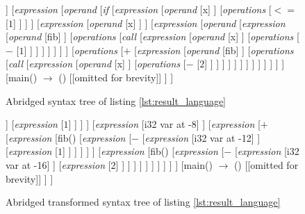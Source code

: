 \begin{figure}
\centering
\begin{forest}
[\textit{file}
	[{fib() $\rightarrow$ i32}
		[\textit{arguments}
			[{x : i32}]
		]
		[\textit{expression}
			[\textit{operand}
				[\textit{if}
					[\textit{expression}
						[\textit{operand}
							[x]
						]
						[\textit{operations}
							[{$<=$}
								[{$1$}]
							]
						]
					]
					[\textit{expression}
						[\textit{operand}
							[x]
						]
					]
					[\textit{expression}
						[\textit{operand}
							[\textit{expression}
								[\textit{operand}
									[fib]
								]
								[\textit{operations}
									[\textit{call}
										[\textit{expression}
											[\textit{operand}
												[x]
											]
											[\textit{operations}
												[{$-$}
													[{$1$}]
												]
											]
										]
									]
								]
							]
						]
						[\textit{operations}
							[{$+$}
								[\textit{expression}
									[\textit{operand}
										[fib]
									]
									[\textit{operations}
										[\textit{call}
											[\textit{expression}
												[\textit{operand}
													[x]
												]
												[\textit{operations}
													[{$-$}
														[{$2$}]
													]
												]
											]
										]
									]
								]
							]
						]
					]
				]
			]
		]
	]
	[{main() $\rightarrow$ ()}
		[{[omitted for brevity]}]
	]
]
\end{forest}
\caption{Abridged syntax tree of listing \ref{lst:result_language}}
\label{fig:result_language_parser_tree}
\end{figure}

\begin{figure}
\centering
\begin{forest}
[\textit{file}
	[{fib() $\rightarrow$ i32}
		[\textit{expression}
			[\textit{if}
				[\textit{expression} : bool
					[{$<=$}
						[\textit{expression}
							[i32 var at -8]
						]
						[\textit{expression}
							[$1$]
						]
					]
				]
				[\textit{expression}
					[i32 var at -8]
				]
				[\textit{expression}
					[{$+$}
						[\textit{expression}
							[fib()
								[\textit{expression}
									[{$-$}
										[\textit{expression}
											[i32 var at -12]
										]
										[\textit{expression}
											[$1$]
										]
									]
								]
							]
						]
						[\textit{expression}
							[fib()
								[\textit{expression}
									[{$-$}
										[\textit{expression}
											[i32 var at -16]
										]
										[\textit{expression}
											[$2$]
										]
									]
								]
							]
						]
					]
				]
			]
		]
	]
	[{main() $\rightarrow$ ()}
		[{[omitted for brevity]}]
	]
]
\end{forest}
\caption{Abridged transformed syntax tree of listing \ref{lst:result_language}}
\label{fig:result_language_transformed_tree}
\end{figure}

